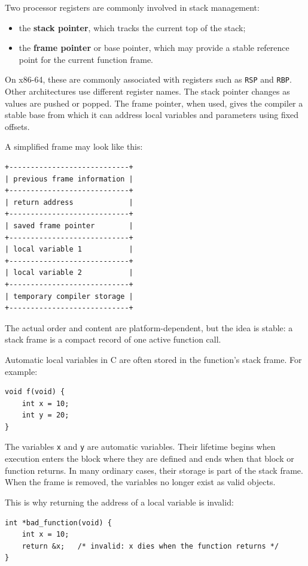 Two processor registers are commonly involved in stack management:

\begin{itemize}
    \item the \textbf{stack pointer}, which tracks the current top of the stack;
    \item the \textbf{frame pointer} or base pointer, which may provide a stable reference point for the current function frame.
\end{itemize}

On x86-64, these are commonly associated with registers such as \texttt{RSP} and \texttt{RBP}. Other architectures use different register names. The stack pointer changes as values are pushed or popped. The frame pointer, when used, gives the compiler a stable base from which it can address local variables and parameters using fixed offsets.

A simplified frame may look like this:

\begin{verbatim}
+----------------------------+
| previous frame information |
+----------------------------+
| return address             |
+----------------------------+
| saved frame pointer        |
+----------------------------+
| local variable 1           |
+----------------------------+
| local variable 2           |
+----------------------------+
| temporary compiler storage |
+----------------------------+
\end{verbatim}

The actual order and content are platform-dependent, but the idea is stable: a stack frame is a compact record of one active function call.

Automatic local variables in C are often stored in the function's stack frame. For example:

\begin{verbatim}
void f(void) {
    int x = 10;
    int y = 20;
}
\end{verbatim}

The variables \texttt{x} and \texttt{y} are automatic variables. Their lifetime begins when execution enters the block where they are defined and ends when that block or function returns. In many ordinary cases, their storage is part of the stack frame. When the frame is removed, the variables no longer exist as valid objects.

This is why returning the address of a local variable is invalid:

\begin{verbatim}
int *bad_function(void) {
    int x = 10;
    return &x;   /* invalid: x dies when the function returns */
}
\end{verbatim}

